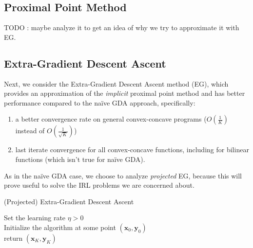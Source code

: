 \subsection{Proximal Point Method}
{
\color{red}
TODO : maybe analyze it to get an idea of why we try to approximate it with EG.
}
\subsection{Extra-Gradient Descent Ascent}

Next, we consider the Extra-Gradient Descent Ascent method (EG), which provides an approximation of the \textit{implicit} proximal point method and has better performance compared to the naïve GDA approach, specifically:
\begin{enumerate}
    \item a better convergence rate on general convex-concave programs ($O(\frac{1}{K})$ instead of $O(\frac{1}{\sqrt{K}})$)
    \item last iterate convergence for all convex-concave functions, including for bilinear functions (which isn't true for naïve GDA).
\end{enumerate}

As in the naïve GDA case, we choose to analyze \textit{projected} EG, because this will prove useful to solve the IRL problems we are concerned about.

\begin{algorithm}[H]
    \label{alg:projEG}
    \SetAlgoLined
    \caption{(Projected) Extra-Gradient Descent Ascent}
    Set the learning rate $\eta >0$ \\
    Initialize the algorithm at some point $(\bm{x}_0,\bm{y}_0)$  \\
    return $(\bm{x}_K,\bm{y}_K)$
\end{algorithm}

